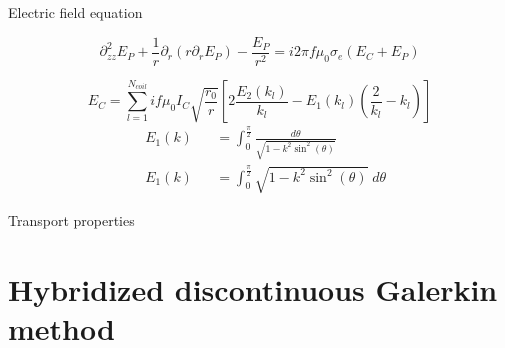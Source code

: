 \documentclass[24pt,t,table, aspectratio=169]{beamer}
\begin{document}
\begin{frame}{Electric field equation}

\begin{framed}
\begin{equation*}
\partial^2_{zz} E_P + \frac{1}{r}\partial_r (r \partial_r E_P) - \frac{E_P}{r^2} = i 2 \pi f\mu_0\sigma_e \left(E_C + E_P\right)
\end{equation*}
\end{framed}

{
\begin{equation*}
	E_C = \sum_{l=1}^{N_{coil}} i f \mu_0 I_C \sqrt{\frac{r_0}{r}}\left[2 \frac{E_2(k_l)}{k_l} - E_1(k_l)\left(\frac{2}{k_l}-k_l\right)\right]
\end{equation*}
\begin{equation*}
	\begin{aligned}
		& E_1(k) &&= \int_0^{\frac{\pi}{2}} \frac{d\theta}{\sqrt{1-k^2 \sin^2(\theta)}}\\
		& E_1(k) &&= \int_0^{\frac{\pi}{2}} \sqrt{1-k^2 \sin^2(\theta)} \; d\theta
	\end{aligned}
\end{equation*}
}

\end{frame}

\begin{frame}{Transport properties}

\end{frame}

\section{Hybridized discontinuous Galerkin method}
\end{document}
